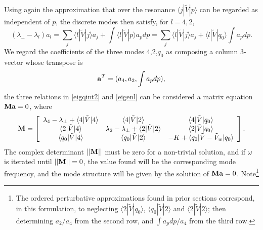 \documentclass[12pt]{article}
\def\ket#1{|#1\rangle}
\def\bra#1{\langle#1}
\def\a{{\bf a}}
\def\M{{\bf M}}
\begin{document}
Using again the approximation that over the resonance
$\bra{j}|\tilde V\ket{p}$ can be regarded as independent of $p$, the
discrete modes then satisfy, for $l=4,2$,
\begin{equation}
  \label{eigenl}
  (\lambda_\perp-\lambda_l)a_l=\sum_j\bra{l}|\tilde{V}\ket{j}a_j
  +\int\bra{l}|\tilde{V}\ket{p}a_pdp
  =\sum_j\bra{l}|\tilde{V}\ket{j}a_j
  +\bra{l}|\tilde{V}\ket{q_0}\int a_pdp.
\end{equation}
We regard the coefficients of the three modes 4,2,$q_0$ as composing a
column 3-vector whose transpose is
\begin{equation}
  \label{avector}
  \a^T=(a_4,a_2,\int a_pdp),
\end{equation}
the three relations in \ref{eigqint2} and \ref{eigenl} can be
considered a matrix equation $\M\a=0$, where
\begin{equation}
  \label{aveq}
  \M=\left[
  \begin{array}{ccc}
    \lambda_4-\lambda_\perp+\bra{4}|\tilde V\ket{4}
    &\bra{4}|\tilde V\ket{2}&\bra{4}|\tilde V\ket{q_0}\\
    \bra{2}|\tilde V\ket{4}
    &\lambda_2-\lambda_\perp+\bra{2}|\tilde
      V\ket{2}&\bra{2}|\tilde V\ket{q_0}\\
    \bra{q_0}|\tilde V\ket{4}
    &\bra{q_0}|\tilde V\ket{2}&-K+\bra{q_0}|\tilde V-\tilde V_w\ket{q_0}
  \end{array}\right]
\iffalse
\left[
  \begin{array}{c}
    a_4\\
    a_2\\
    \int a_pdp
  \end{array}\right]=0.
\fi.
\end{equation}
The complex determinant $||\M||$ must be zero for a non-trivial
solution, and if $\omega$ is iterated until $||\M||=0$, the value
found will be the corresponding mode frequency, and the mode structure
will be given by the solution of $\M\a=0$. Note\footnote{
The ordered perturbative approximations found in prior sections correspond,
in this formulation, to neglecting $\bra{2}|\tilde V\ket{q_0}$,
$\bra{q_0}|\tilde V\ket{2}$ and $\bra{2}|\tilde V\ket{2}$; then
determining $a_2/a_4$ from the second row, and $\int a_pdp/a_4$ from the third
row.}
\end{document}
